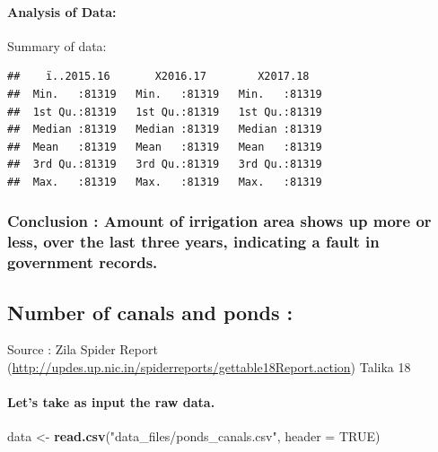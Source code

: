 \documentclass[]{article}
\newenvironment{Shaded}{\begin{snugshade}}{\end{snugshade}}
\newcommand{\KeywordTok}[1]{\textcolor[rgb]{0.13,0.29,0.53}{\textbf{#1}}}
\newcommand{\DataTypeTok}[1]{\textcolor[rgb]{0.13,0.29,0.53}{#1}}
\newcommand{\StringTok}[1]{\textcolor[rgb]{0.31,0.60,0.02}{#1}}
\newcommand{\OtherTok}[1]{\textcolor[rgb]{0.56,0.35,0.01}{#1}}
\newcommand{\NormalTok}[1]{#1}
\let\oldparagraph\paragraph
\renewcommand{\paragraph}[1]{\oldparagraph{#1}\mbox{}}
\begin{document}
\paragraph{Analysis of Data:}\label{analysis-of-data-6}

Summary of data:

\begin{verbatim}
##    ï..2015.16       X2016.17        X2017.18    
##  Min.   :81319   Min.   :81319   Min.   :81319  
##  1st Qu.:81319   1st Qu.:81319   1st Qu.:81319  
##  Median :81319   Median :81319   Median :81319  
##  Mean   :81319   Mean   :81319   Mean   :81319  
##  3rd Qu.:81319   3rd Qu.:81319   3rd Qu.:81319  
##  Max.   :81319   Max.   :81319   Max.   :81319
\end{verbatim}

\subsubsection{\texorpdfstring{\textbf{Conclusion} : Amount of
irrigation area shows up more or less, over the last three years,
indicating a fault in government
records.}{Conclusion : Amount of irrigation area shows up more or less, over the last three years, indicating a fault in government records.}}\label{conclusion-amount-of-irrigation-area-shows-up-more-or-less-over-the-last-three-years-indicating-a-fault-in-government-records.}

\subsection{Number of canals and ponds
:}\label{number-of-canals-and-ponds}

Source : Zila Spider Report
(\url{http://updes.up.nic.in/spiderreports/gettable18Report.action})
Talika 18

\paragraph{Let's take as input the raw
data.}\label{lets-take-as-input-the-raw-data.-7}

\begin{Shaded}
\begin{Highlighting}[]
\NormalTok{data <-}\StringTok{ }\KeywordTok{read.csv}\NormalTok{(}\StringTok{"data_files/ponds_canals.csv"}\NormalTok{, }\DataTypeTok{header =} \OtherTok{TRUE}\NormalTok{)}
\end{Highlighting}
\end{Shaded}
\end{document}
